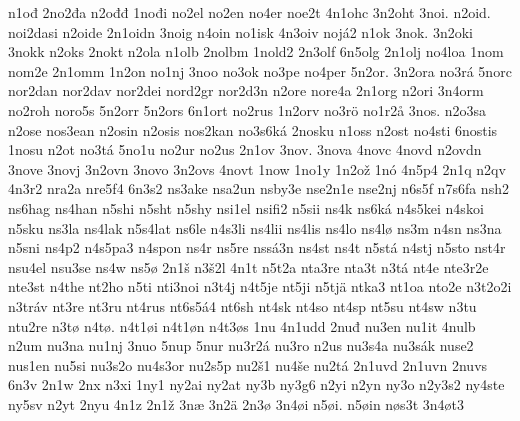 {    n1ođ
    2no2đa
    n2ođđ
    1nođi
    no2el
    no2en
    no4er
    noe2t
    4n1ohc
    3n2oht
    3noi.
    n2oid.
    noi2dasi
    n2oide
    2n1oidn
    3noig
    n4oin
    no1isk
    4n3oiv
    nojá2
    n1ok
    3nok.
    3n2oki
    3nokk
    n2oks
    2nokt
    n2ola
    n1olb
    2nolbm
    1nold2
    2n3olf
    6n5olg
    2n1olj
    no4loa
    1nom
    nom2e
    2n1omm
    1n2on
    no1nj
    3noo
    no3ok
    no3pe
    no4per
    5n2or.
    3n2ora
    no3rá
    5norc
    nor2dan
    nor2dav
    nor2dei
    nord2gr
    nor2d3n
    n2ore
    nore4a
    2n1org
    n2ori
    3n4orm
    no2roh
    noro5s
    5n2orr
    5n2ors
    6n1ort
    no2rus
    1n2orv
    no3rö
    no1r2å
    3nos.
    n2o3sa
    n2ose
    nos3ean
    n2osin
    n2osis
    nos2kan
    no3s6ká
    2nosku
    n1oss
    n2ost
    no4sti
    6nostis
    1nosu
    n2ot
    no3tá
    5no1u
    no2ur
    no2us
    2n1ov
    3nov.
    3nova
    4novc
    4novd
    n2ovdn
    3nove
    3novj
    3n2ovn
    3novo
    3n2ovs
    4novt
    1now
    1no1y
    1n2ož
    1nó
    4n5p4
    2n1q
    n2qv
    4n3r2
    nra2a
    nre5f4
    6n3s2
    ns3ake
    nsa2un
    nsby3e
    nse2n1e
    nse2nj
    n6s5f
    n7s6fa
    nsh2
    ns6hag
    ns4han
    n5shi
    n5sht
    n5shy
    nsi1el
    nsifi2
    n5sii
    ns4k
    ns6ká
    n4s5kei
    n4skoi
    n5sku
    ns3la
    ns4lak
    n5s4lat
    ns6le
    n4s3li
    ns4lii
    ns4lis
    ns4lo
    ns4lø
    ns3m
    n4sn
    ns3na
    n5sni
    ns4p2
    n4s5pa3
    n4spon
    ns4r
    ns5re
    nssá3n
    ns4st
    ns4t
    n5stá
    n4stj
    n5sto
    nst4r
    nsu4el
    nsu3se
    ns4w
    ns5ø
    2n1š
    n3š2l
    4n1t
    n5t2a
    nta3re
    nta3t
    n3tá
    nt4e
    nte3r2e
    nte3st
    n4the
    nt2ho
    n5ti
    nti3noi
    n3t4j
    n4t5je
    nt5ji
    n5tjä
    ntka3
    nt1oa
    nto2e
    n3t2o2i
    n3tráv
    nt3re
    nt3ru
    nt4rus
    nt6s5á4
    nt6sh
    nt4sk
    nt4so
    nt4sp
    nt5su
    nt4sw
    n3tu
    ntu2re
    n3tø
    n4tø.
    n4t1øi
    n4t1øn
    n4t3øs
    1nu
    4n1udd
    2nuđ
    nu3en
    nu1it
    4nulb
    n2um
    nu3na
    nu1nj
    3nuo
    5nup
    5nur
    nu3r2á
    nu3ro
    n2us
    nu3s4a
    nu3sák
    nuse2
    nus1en
    nu5si
    nu3s2o
    nu4s3or
    nu2s5p
    nu2š1
    nu4še
    nu2tá
    2n1uvd
    2n1uvn
    2nuvs
    6n3v
    2n1w
    2nx
    n3xi
    1ny1
    ny2ai
    ny2at
    ny3b
    ny3g6
    n2yi
    n2yn
    ny3o
    n2y3s2
    ny4ste
    ny5sv
    n2yt
    2nyu
    4n1z
    2n1ž
    3næ
    3n2ä
    2n3ø
    3n4øi
    n5øi.
    n5øin
    nøs3t
    3n4øt3
}
